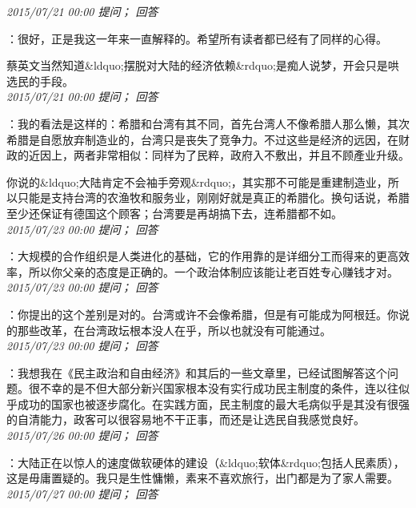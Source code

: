 \documentclass[twocolumn]{ctexart}
\begin{document}
\textit{\hfill\noindent\small 2015/07/21 00:00 提问； 回答}

：很好，正是我这一年来一直解释的。希望所有读者都已经有了同样的心得。

蔡英文当然知道\&ldquo;摆脱对大陆的经济依赖\&rdquo;是痴人说梦，开会只是哄选民的手段。\\

\textit{\hfill\noindent\small 2015/07/21 00:00 提问； 回答}

：我的看法是这样的：希腊和台湾有其不同，首先台湾人不像希腊人那么懒，其次希腊是自愿放弃制造业的，台湾只是丧失了竞争力。不过这些是经济的远因，在财政的近因上，两者非常相似：同样为了民粹，政府入不敷出，并且不顾產业升级。

你说的\&ldquo;大陆肯定不会袖手旁观\&rdquo;，其实那不可能是重建制造业，所以只能是支持台湾的农渔牧和服务业，刚刚好就是真正的希腊化。换句话说，希腊至少还保证有德国这个顾客；台湾要是再胡搞下去，连希腊都不如。\\

\textit{\hfill\noindent\small 2015/07/23 00:00 提问； 回答}

：大规模的合作组织是人类进化的基础，它的作用靠的是详细分工而得来的更高效率，所以你父亲的态度是正确的。一个政治体制应该能让老百姓专心赚钱才对。\\

\textit{\hfill\noindent\small 2015/07/23 00:00 提问； 回答}

：你提出的这个差别是对的。台湾或许不会像希腊，但是有可能成为阿根廷。你说的那些改革，在台湾政坛根本没人在乎，所以也就没有可能通过。\\

\textit{\hfill\noindent\small 2015/07/23 00:00 提问； 回答}

：我想我在《民主政治和自由经济》和其后的一些文章里，已经试图解答这个问题。很不幸的是不但大部分新兴国家根本没有实行成功民主制度的条件，连以往似乎成功的国家也被逐步腐化。在实践方面，民主制度的最大毛病似乎是其没有很强的自清能力，政客可以很容易地不干正事，而还是让选民自我感觉良好。\\

\textit{\hfill\noindent\small 2015/07/26 00:00 提问； 回答}

：大陆正在以惊人的速度做软硬体的建设（\&ldquo;软体\&rdquo;包括人民素质），这是毋庸置疑的。我只是生性慵懒，素来不喜欢旅行，出门都是为了家人需要。\\

\textit{\hfill\noindent\small 2015/07/27 00:00 提问； 回答}
\end{document}
